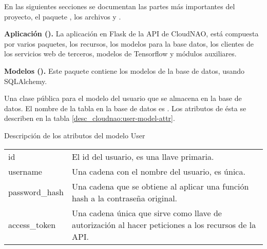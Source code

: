 En las siguientes secciones se documentan las partes más importantes del
proyecto, el paquete , los
archivos  y .


\textbf{Aplicación ().}
\label{\detokenize{chapter_two/desc_cloudnao:aplicacion-app}}\label{\detokenize{chapter_two/desc_cloudnao:module-app}}
La aplicación en Flask de la API de CloudNAO, está compuesta por varios paquetes,
los recursos, los modelos para la base datos, los clientes de los servicios web de
terceros, modelos de Tensorflow y módulos auxiliares.

\textbf{Modelos ().}
\label{\detokenize{chapter_two/desc_cloudnao:module-app.models}}\label{\detokenize{chapter_two/desc_cloudnao:modelos-models}}
Este paquete contiene los modelos de la base de datos, usando SQLAlchemy.
\newline
{}\label{\detokenize{chapter_two/desc_cloudnao:module-app.models.user_model}}\label{\detokenize{chapter_two/desc_cloudnao:module-user_model}}


Una clase pública para el modelo del usuario que se almacena en la base
de datos.
El nombre de la tabla en la base de datos es . Los atributos de ésta
se describen en la tabla \ref{desc_cloudnao:user-model-attr}.

\begin{savenotes}\sphinxattablestart
\centering
{}
\caption{Descripción de los atributos del modelo User\label{desc_cloudnao:user-model-attr}}
\sphinxaftercaption
\begin{tabulary}{\linewidth}[t]{|T|T|}
\hline
{}\relax &\relax \\
\hline
id
&
El id del usuario, es una llave primaria.
\\
\hline
username
&
Una cadena con el nombre del usuario, es única.
\\
\hline
password\_hash
&
Una cadena que se obtiene al aplicar una función hash a la contraseña original. 
\\
\hline
access\_token
&
Una cadena única que sirve como llave de autorización al hacer peticiones a los recursos de la API.
\\
\hline
\end{tabulary}
\par
\sphinxattableend\end{savenotes}

